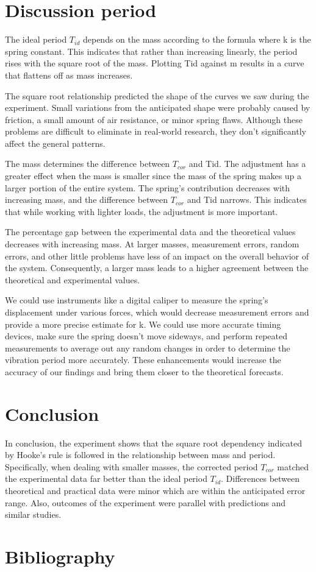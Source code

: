 \documentclass[a4paper, 10pt]{article}
\begin{document}
\begin{justify}
\section{Discussion period}
The ideal period $T_{id}$ depends on the mass according to the formula where k is the spring constant. This indicates that rather than increasing linearly, the period rises with the square root of the mass. Plotting Tid against m results in a curve that flattens off as mass increases.
\par
The square root relationship predicted the shape of the curves we saw during the experiment. Small variations from the anticipated shape were probably caused by friction, a small amount of air resistance, or minor spring flaws. Although these problems are difficult to eliminate in real-world research, they don't significantly affect the general patterns.
\par
The mass determines the difference between $T_{cor}$ and Tid. The adjustment has a greater effect when the mass is smaller since the mass of the spring makes up a larger portion of the entire system. The spring's contribution decreases with increasing mass, and the difference between $T_{cor}$ and Tid narrows. This indicates that while working with lighter loads, the adjustment is more important.
\par
The percentage gap between the experimental data and the theoretical values decreases with increasing mass. At larger masses, measurement errors, random errors, and other little problems have less of an impact on the overall behavior of the system. Consequently, a larger mass leads to a higher agreement between the theoretical and experimental values.
\par
We could use instruments like a digital caliper to measure the spring's
displacement under various forces, which would decrease measurement errors and
provide a more precise estimate for k. We could use more accurate timing
devices, make sure the spring doesn't move sideways, and perform repeated
measurements to average out any random changes in order to determine the
vibration period more accurately. These enhancements would increase the accuracy
of our findings and bring them closer to the theoretical forecasts. 
\section{Conclusion}
In conclusion, the experiment shows that the square root dependency indicated by
Hooke's rule is followed in the relationship between mass and period.
Specifically, when dealing with smaller masses, the corrected period $T_{cor}$
matched the experimental data far better than the ideal period $T_{id}$. Differences
between theoretical and practical data were minor which are within the
anticipated error range. Also, outcomes of the experiment were parallel with
predictions and similar studies. 
\section{Bibliography}


\end{justify}

\end{document}
